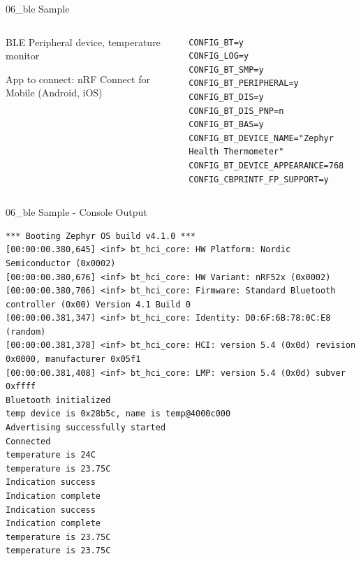 \documentclass[10pt, aspectratio=169]{beamer}
\begin{document}
\begin{frame}[fragile]{06\_ble Sample}
  \begin{columns}
    \begin{column}{0.6\textwidth}
      \begin{description}
     \item
	\item [Description] BLE Peripheral device, temperature monitor \footnotemark
	\item [Sample] App to connect: nRF Connect for Mobile (Android, iOS)
      \end{description}
    \end{column}
    \begin{column}{0.4\textwidth}
        {\fontsize{6}{6}\selectfont
  \begin{listing}[H]
    \begin{verbatim}
CONFIG_BT=y
CONFIG_LOG=y
CONFIG_BT_SMP=y
CONFIG_BT_PERIPHERAL=y
CONFIG_BT_DIS=y
CONFIG_BT_DIS_PNP=n
CONFIG_BT_BAS=y
CONFIG_BT_DEVICE_NAME="Zephyr Health Thermometer"
CONFIG_BT_DEVICE_APPEARANCE=768
CONFIG_CBPRINTF_FP_SUPPORT=y
    \end{verbatim}
    \caption{\scriptsize{Excerpt from samples/06\_ble/prj.conf}}
  \end{listing}
        }
    \end{column}
  \end{columns}
\end{frame}
\begin{frame}[fragile]{06\_ble Sample - Console Output}
  \begin{listing}[H]
    \begin{verbatim}
*** Booting Zephyr OS build v4.1.0 ***
[00:00:00.380,645] <inf> bt_hci_core: HW Platform: Nordic Semiconductor (0x0002)
[00:00:00.380,676] <inf> bt_hci_core: HW Variant: nRF52x (0x0002)
[00:00:00.380,706] <inf> bt_hci_core: Firmware: Standard Bluetooth controller (0x00) Version 4.1 Build 0
[00:00:00.381,347] <inf> bt_hci_core: Identity: D0:6F:6B:78:0C:E8 (random)
[00:00:00.381,378] <inf> bt_hci_core: HCI: version 5.4 (0x0d) revision 0x0000, manufacturer 0x05f1
[00:00:00.381,408] <inf> bt_hci_core: LMP: version 5.4 (0x0d) subver 0xffff
Bluetooth initialized
temp device is 0x28b5c, name is temp@4000c000
Advertising successfully started
Connected
temperature is 24C
temperature is 23.75C
Indication success
Indication complete
Indication success
Indication complete
temperature is 23.75C
temperature is 23.75C
    \end{verbatim}
  \end{listing}
\end{frame}
\end{document}
